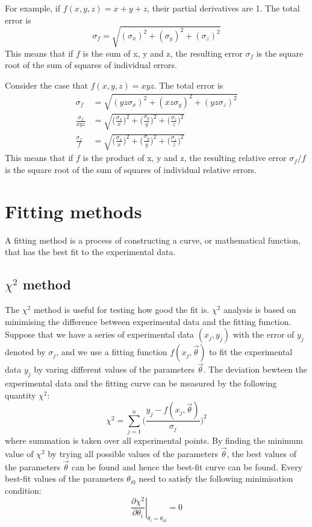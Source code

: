 \documentclass[12pt,a4paper]{report}
\begin{document}
For example, if $f(x,y,z) = x+y+z$, their partial derivatives are 1. The total error is
\begin{equation}
\sigma_{f} = \sqrt{( \sigma_x )^2 + ( \sigma_y )^2+ ( \sigma_z )^2}
\end{equation}
 This means that if $f$ is the sum of x, y and z, the resulting error $\sigma_{f}$ is the square root of the sum of squares of individual errors.
 
Consider the case that $f(x,y,z) = xyz$. The total error is
\begin{align}
\sigma_{f} &= \sqrt{( yz \sigma_x )^2 + ( xz \sigma_y )^2+ ( yz \sigma_z )^2} \\
\frac{ \sigma_{f} }{xyz} &= \sqrt{ \Big( \frac{\sigma_x}{x} \Big)^2 + \Big( \frac{\sigma_y}{y} \Big)^2 + \Big( \frac{\sigma_z}{z} \Big)^2} \\
\frac{ \sigma_{f} }{f} &= \sqrt{ \Big( \frac{\sigma_x}{x} \Big)^2 + \Big( \frac{\sigma_y}{y} \Big)^2 + \Big( \frac{\sigma_z}{z} \Big)^2}
\end{align}
This means that if $f$ is the product of x, y and z, the resulting relative error $\sigma_{f}/f$ is the square root of the sum of squares of individual relative errors.

\section{Fitting methods}
A fitting method is a process of constructing a curve, or mathematical function, that has the best fit to the experimental data.
\subsection{$\chi^2$ method}
The $\chi^2$ method is useful for testing how good the fit is.
$\chi^2$ analysis \cite{stat_2, BAKER1984437, reduced_chi_squared} is based on minimising the difference between experimental data and the fitting function. Suppose that we have a series of experimental data $(x_j,y_j)$ with the error of $y_j$ denoted by $\sigma_j$, and we use a fitting function $f(x_j,\vec{\theta})$ to fit the experimental data $y_j$ by varing different values of the parameters $\vec{\theta}$. The deviation bewteen the experimental data and the fitting curve can be measured by the following quantity $\chi^2$:
\begin{equation} \label{chi_square_formula}
\chi^2 = \sum_{j = 1}^{n} \Big ( \frac{y_j - f(x_j,\vec{\theta})}{\sigma_j} \Big )^2
\end{equation}
where summation is taken over all experimental points.
By finding the minimum value of $\chi^2$ by trying all possible values of the parameters $\vec{\theta}$, the best values of the parameters $\vec{\theta}$ can be found and hence the best-fit curve can be found.
Every best-fit values of the parameters $\theta_{i0}$ need to satisfy the following minimisation condition:
\begin{equation} \label{chi_minimisation_condition}
\left. \frac{\partial \chi^2}{\partial \theta_i} \right|_{\theta_{i} = \theta_{i0}} = 0
\end{equation}
\end{document}
